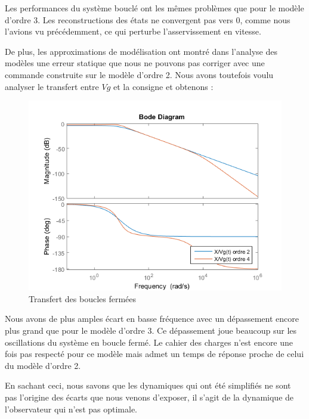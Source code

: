 Les performances du système bouclé ont les mêmes problèmes que pour le modèle d'ordre 3. Les reconstructions des états ne convergent pas vers 0, comme nous l'avions vu précédemment, ce qui perturbe l'asservissement en vitesse.

De plus, les approximations de modélisation ont montré dans l'analyse des modèles une erreur statique que nous ne pouvons pas corriger avec une commande construite sur le modèle d'ordre 2. Nous avons toutefois voulu analyser le transfert entre $Vg$ et la consigne et obtenons :
\begin{figure}[!ht]
\centering
\includegraphics[scale=1]{./III/figure/bode_Tpert_EE0.png}
\caption{Transfert des boucles fermées}
\end{figure}
Nous avons de plus amples écart en basse fréquence avec un dépassement encore plus grand que pour le modèle d'ordre 3. Ce dépassement joue beaucoup sur les oscillations du système en boucle fermé. Le cahier des charges n'est encore une fois pas respecté pour ce modèle mais admet un temps de réponse proche de celui du modèle d'ordre 2.

En sachant ceci, nous savons que les dynamiques qui ont été simplifiés ne sont pas l'origine des écarts que nous venons d'exposer, il s'agit de la dynamique de l'observateur qui n'est pas optimale. 

